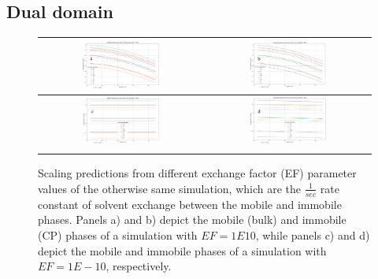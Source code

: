 \subsection{Dual domain}

\begin{figure}[h!]
    \centering
    \begin{tabular}{c|c}
        \includegraphics[width=0.49\textwidth]{images/ROSSpy/sensitivity_analyses/EF/mobile_large_ef.png} &
        \includegraphics[width=0.49\textwidth]{images/ROSSpy/sensitivity_analyses/EF/immobile_large_ef.png} \\ \midrule
        \includegraphics[width=0.49\textwidth]{images/ROSSpy/sensitivity_analyses/EF/mobile_small_ef.png} & 
        \includegraphics[width=0.49\textwidth]{images/ROSSpy/sensitivity_analyses/EF/immobile_small_ef.png} \\ \bottomrulerule
    \end{tabular}
    \caption{
        Scaling predictions from different exchange factor (EF) parameter values of the otherwise same simulation, which are the $\frac{1}{sec}$ rate constant of solvent exchange between the mobile and immobile phases. Panels a) and b) depict the mobile (bulk) and immobile (CP) phases of a simulation with $EF=1E10$, while panels c) and d) depict the mobile and immobile phases of a simulation with $EF=1E-10$, respectively.
    }
    \label{ef_values}
\end{figure}

